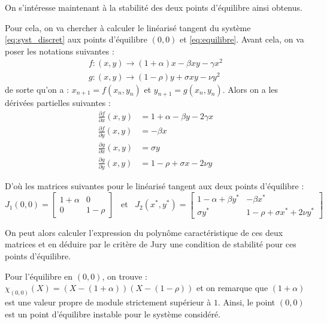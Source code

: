 On s'intéresse maintenant à la stabilité des deux points d'équilibre ainsi obtenus.

Pour cela, on va chercher à calculer le linéarisé tangent du système \ref{eq:syst_discret} aux points d'équilibre $(0, 0)$ et \ref{eq:equilibre}.
Avant cela, on va poser les notations suivantes :
\begin{align}
    f : (x, y) \rightarrow (1 + \alpha) x - \beta x y - \gamma x^2 \\
    g : (x, y) \rightarrow (1 - \rho) y + \sigma x y - \nu y^2
\end{align}
de sorte qu'on a : $x_{n+1} = f(x_n, y_n)$ et $y_{n+1} = g(x_n, y_n)$.
\newline
Alors on a les dérivées partielles suivantes :
\begin{align}
    \frac{\partial f}{\partial x}(x,y) &= 1 + \alpha - \beta y - 2 \gamma x \\
    \frac{\partial f}{\partial y}(x,y) &= - \beta x \\
    \frac{\partial g}{\partial x}(x,y) &= \sigma y \\
    \frac{\partial g}{\partial y}(x,y) &= 1 - \rho + \sigma x - 2 \nu y 
\end{align}

D'où les matrices suivantes pour le linéarisé tangent aux deux points d'équilibre :
\begin{equation}
    J_{1}(0,0) = 
  \begin{bmatrix}
    1 + \alpha & 0 \\
    0 & 1 - \rho
  \end{bmatrix}
  \hspace{10pt}
  \text{et}
  \hspace{10pt}
  J_{2}(x^*, y^*) = 
  \begin{bmatrix}
    1 - \alpha + \beta y^* & - \beta x^* \\
    \sigma y^* & 1 - \rho + \sigma x^* + 2 \nu y^*
  \end{bmatrix}
\end{equation}

On peut alors calculer l'expression du polynôme caractéristique de ces deux matrices et en déduire par le critère de Jury une condition de stabilité pour ces points d'équilibre.

Pour l'équilibre en $(0,0)$, on trouve : $\chi_{(0,0)} (X) = (X - (1 + \alpha))(X - (1 - \rho))$ et on remarque que $(1 + \alpha)$ est une valeur propre de module strictement supérieur à $1$. Ainsi, le point $(0, 0)$ est un point d'équilibre instable pour le système considéré.

